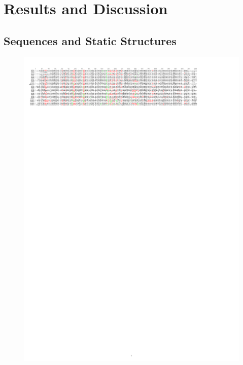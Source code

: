 \chapter{Results and Discussion}

\section{Sequences and Static Structures}
\begin{figure}[h!]
	\label{MSA + RMSDs}
	\includegraphics[width = .99\textwidth]{figures/MSA_matrix.pdf}\\[.5cm]
	\begin{minipage}{.32\linewidth}

\end{minipage}
\end{figure}
